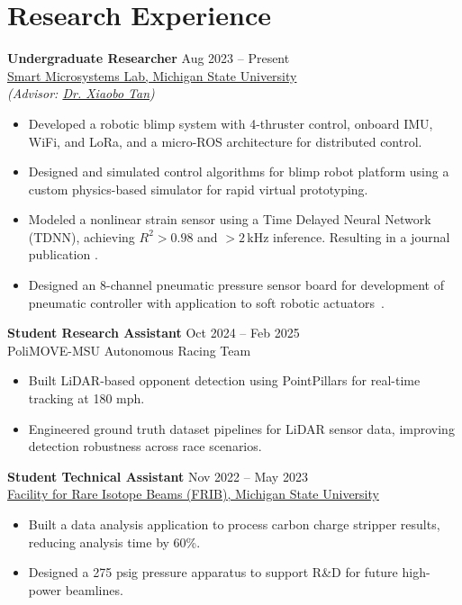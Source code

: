 \section{Research Experience}
\textbf{Undergraduate Researcher} \hfill Aug 2023 -- Present\\
\href{https://www.egr.msu.edu/sml/}{Smart Microsystems Lab, Michigan State University} \\
\textit{(Advisor: \href{https://www.egr.msu.edu/~xbtan/}{Dr. Xiaobo Tan})}
\begin{itemize}[noitemsep,leftmargin=1em]
  \item Developed a robotic blimp system with 4-thruster control, onboard IMU, WiFi, and LoRa, and a micro-ROS architecture for distributed control.
  \item Designed and simulated control algorithms for blimp robot platform using a custom physics-based simulator for rapid virtual prototyping.
  \item Modeled a nonlinear strain sensor using a Time Delayed Neural Network (TDNN), achieving $R^2 > 0.98$ and $> 2$\,kHz inference. Resulting in a journal publication \cite{Naik2025-gp}.
  \item Designed an 8-channel pneumatic pressure sensor board for development of pneumatic controller with application to soft robotic actuators~\cite{mei2026bipolar}.
\end{itemize}

\textbf{Student Research Assistant} \hfill Oct 2024 -- Feb 2025\\
PoliMOVE-MSU Autonomous Racing Team
\begin{itemize}[noitemsep,leftmargin=1em]
  \item Built LiDAR-based opponent detection using PointPillars for real-time tracking at 180 mph.
  \item Engineered ground truth dataset pipelines for LiDAR sensor data, improving detection robustness across race scenarios.
\end{itemize}

\textbf{Student Technical Assistant} \hfill Nov 2022 -- May 2023\\
\href{https://frib.msu.edu/}{Facility for Rare Isotope Beams (FRIB), Michigan State University}
\begin{itemize}[noitemsep,leftmargin=1em]
  \item Built a data analysis application to process carbon charge stripper results, reducing analysis time by 60\%.
  \item Designed a 275 psig pressure apparatus to support R\&D for future high-power beamlines.
\end{itemize}

